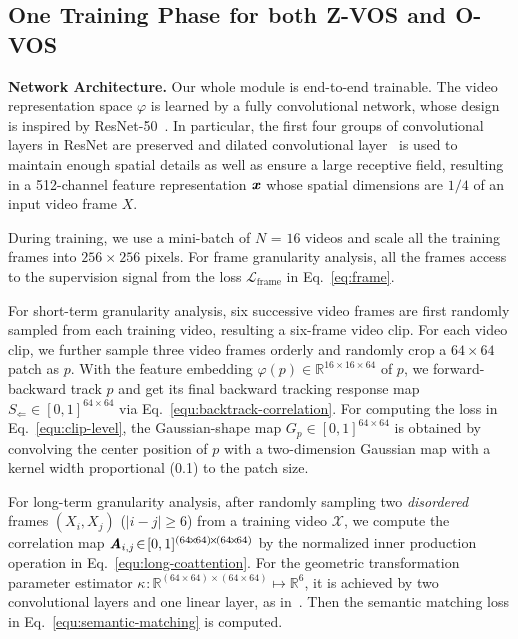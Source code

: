 \documentclass[10pt,twocolumn,letterpaper]{article}
\begin{document}
\vspace{-2pt}
\subsection{\!One$_{\!}$ Training$_{\!}$ Phase$_{\!}$ for$_{\!}$ both$_{\!}$ Z-VOS$_{\!}$ and$_{\!}$ O-VOS}
\label{sec:architecture}
\vspace{-1pt}
\noindent\textbf{Network Architecture.} Our whole module is end-to-end trainable.
The video representation space $\varphi$ is learned by a fully convolutional network, whose design is inspired by ResNet-50~\!\cite{he2016deep}. In particular, the first four groups of convolutional layers in ResNet are preserved and dilated convolutional layer~\!\cite{yu2015multi} is used to maintain enough spatial details as well as ensure a large receptive field, resulting in a 512-channel feature representation $\textbf{\textit{x}}$ whose spatial dimensions are $1/4$ of an input video frame $X$.

During training, we use a mini-batch of $N_{\!}\!=_{\!}\!16$ videos and scale all the training frames into $256_{\!}\!\times_{\!}\!256$ pixels.
For frame granularity analysis, all the frames access to the supervision signal from the loss $\mathcal{L}_{\text{frame}}$ in Eq.~\!\ref{eq:frame}.

For short-term granularity analysis, six successive video frames are first randomly sampled from each training video, resulting a six-frame video clip. For each video clip, we further sample three video frames orderly and randomly crop a $64\!\times\!64$ patch as $p$. With the feature embedding $\varphi(p)\!\in\!\mathbb{R}^{16\!\times\!16\!\times64}$ of $p$, we forward-backward track $p$ and get its final backward tracking response map ${S}_{\Leftarrow\!}\!\in\![0,1]^{64\!\times\!64}$ via Eq.~\!\ref{equ:backtrack-correlation}. For computing the loss in Eq.~\!\ref{equ:clip-level}, the Gaussian-shape map $G_p\!\in\![0,1]^{64\!\times\!64}$ is obtained by convolving the center position of $p$ with a two-dimension Gaussian map with a kernel width proportional (0.1) to the patch size.

For long-term granularity analysis, after randomly sampling two \textit{disordered} frames $(X_i, X_j)$ ($|i\!-\!j|\!\!\geq\!\!6$) from a training video $\mathcal{X}$, we compute the correlation map $\textbf{\textit{A}}_{i,j}\!\in\![0,1]^{(64\!\times\!64)\!\times\!(64\!\times\!64)}$ by the normalized inner production operation in Eq.~\!\ref{equ:long-coattention}. For the geometric transformation parameter estimator $\kappa_{\!}\!:\!\mathbb{R}^{(64\!\times\!64)\!\times\!(64\!\times\!64)}\!\mapsto\!\mathbb{R}^{6\!}$, it is achieved by two convolutional layers and one linear layer, as in~\!\cite{rocco2018end}. Then the semantic matching loss in Eq.~\!\ref{equ:semantic-matching} is computed.
\end{document}

